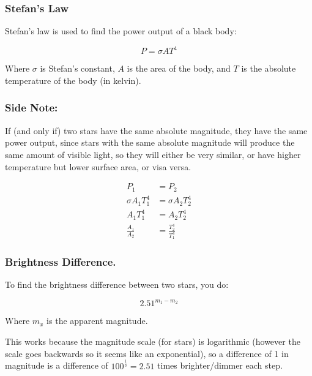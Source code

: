 \documentclass[a4paper, 12pt]{article}
\begin{document}
\subsubsection{Stefan's Law}

Stefan's law is used to find the power output of a black body:

$$
P = {\sigma}AT^4
$$

Where $\sigma$ is Stefan's constant, $A$ is the area of the body, and $T$ is the absolute temperature of the body (in kelvin).

\subsubsection{Side Note:}

If (and only if) two stars have the same absolute magnitude, they have the same power output, since stars with the same absolute magnitude will produce the same amount of visible light, so they will either be very similar, or have higher temperature but lower surface area, or visa versa.

\begin{align*}
P_1 &= P_2 \\
\sigma A_1 T^4_1 &= \sigma A_2 T^4_2 \\
A_1 T^4_1 &= A_2 T^4_2 \\
\frac{A_1}{A_2} &= \frac{T^4_2}{T^4_1}
\end{align*}

\subsubsection{Brightness Difference.}

To find the brightness difference between two stars, you do:

$$
2.51^{m_1 - m_2}
$$

Where $m_x$ is the apparent magnitude.

This works because the magnitude scale (for stars) is logarithmic (however the scale goes backwards so it seems like an exponential), so a difference of 1 in magnitude is a difference of $100^{\frac{1}{5}} = 2.51$ times brighter/dimmer each step.
\end{document}
